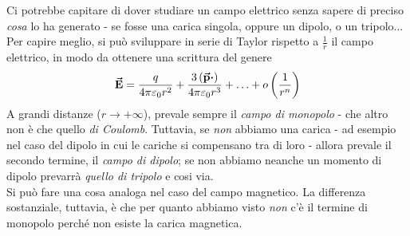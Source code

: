 		\begin{observe}
			Ci potrebbe capitare di dover studiare un campo elettrico senza sapere di preciso \textit{cosa} lo ha generato - se fosse una carica singola, oppure un dipolo, o un tripolo... Per capire meglio, si può sviluppare in serie di Taylor rispetto a $\frac{1}{r}$ il campo elettrico, in modo da ottenere una scrittura del genere
			\begin{equation*}
				\vba{E}=\frac{q}{4\pi \epsilon_0 r^2}+\frac{3\left(\vba{p}\vdot \right)}{4\pi\epsilon_0r^3}+\ldots+o\left(\frac{1}{r^n}\right)
			\end{equation*}
			A grandi distanze ($r\to+\infty$), prevale sempre il \textit{campo di monopolo} - che altro non è che quello \textit{di Coulomb}. Tuttavia, se \textit{non} abbiamo una carica - ad esempio nel caso del dipolo in cui le cariche si compensano tra di loro - allora prevale il secondo termine, il \textit{campo di dipolo}; se non abbiamo neanche un momento di dipolo prevarrà \textit{quello di tripolo} e cosi via.\\
			Si può fare una cosa analoga nel caso del campo magnetico. La differenza sostanziale, tuttavia, è che per quanto abbiamo visto \textit{non} c'è il termine di monopolo perché non esiste la carica magnetica.
		\end{observe}
